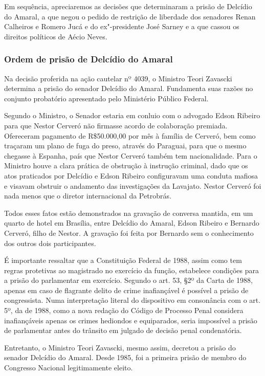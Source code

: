Em sequência, apreciaremos as decisões que determinaram a prisão de
Delcídio do Amaral, a que negou o pedido de restrição de liberdade dos
senadores Renan Calheiros e Romero Jucá e do ex"-presidente José Sarney e
a que cassou os direitos políticos de Aécio Neves.

\subsubsection{Ordem de prisão de Delcídio do Amaral}

Na decisão proferida na ação cautelar nº 4039, o Ministro Teori Zavascki
determina a prisão do senador Delcídio do Amaral. Fundamenta suas razões
no conjunto probatório apresentado pelo Ministério Público Federal.

Segundo o Ministro, o Senador estaria em conluio com o advogado Edson
Ribeiro para que Nestor Cerveró não firmasse acordo de colaboração
premiada. Ofereceram pagamento de R\$50.000,00 por mês à família de
Cerveró, bem como traçaram um plano de fuga do preso, através do
Paraguai, para que o mesmo chegasse à Espanha, país que Nestor Cerveró
também tem nacionalidade. Para o Ministro houve a clara prática de
obstrução à instrução criminal, dado que os atos praticados por Delcídio
e Edson Ribeiro configuravam uma conduta mafiosa e visavam obstruir o andamento
das investigações da Lavajato. Nestor Cerveró foi nada menos que o
diretor internacional da Petrobrás.

Todos esses fatos estão demonstrados na gravação de conversa mantida, em
um quarto de hotel em Brasília, entre Delcídio do Amaral, Edson Ribeiro
e Bernardo Cerveró, filho de Nestor. A gravação foi feita por Bernardo
sem o conhecimento dos outros dois participantes.

É importante ressaltar que a Constituição Federal de 1988, assim como tem
regras protetivas ao magistrado no exercício da função, estabelece
condições para a prisão do parlamentar em exercício. Segundo o art. 53,
§2º da Carta de 1988, apenas em caso de flagrante delito de crime
inafiançável é possível a prisão de congressista. Numa interpretação
literal do dispositivo em consonância com o art. 5º,  da  de 1988,
como a nova redação do Código de Processo Penal considera inafiançáveis
apenas os crimes hediondos e equiparados, seria impossível a prisão de
parlamentar antes do trânsito em julgado de decisão penal condenatória.

Entretanto, o Ministro Teori Zavascki, mesmo assim, decretou a prisão do
senador Delcídio do Amaral. Desde 1985, foi a primeira prisão de membro
do Congresso Nacional legitimamente eleito.

